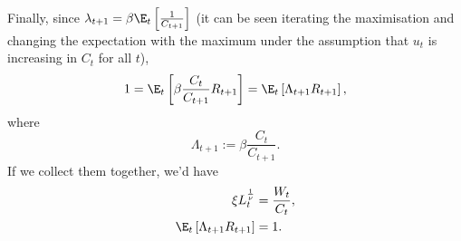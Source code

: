 \documentclass{article}
\begin{document}
	Finally, since $\lambda_{t+1} = \beta \E_t\left[\frac{1}{C_{t+1}}\right]$ (it can be seen iterating the maximisation and changing the expectation with the maximum under the assumption that $u_t$ is increasing in $C_{t}$ for all $t$),
		\begin{equation}
		1 = \E_t\left[\beta\frac{C_t}{C_{t+1}}R_{t+1}\right] = \E_t\left[\Lambda_{t+1} R_{t+1}\right],
	\end{equation}
	where
\begin{equation}\label{eq:RBC_GK_Lambda}
		\Lambda_{t+1}:= \beta \frac{C_t}{C_{t+1}}.
\end{equation}
	 If we collect them together, we'd have
	\begin{align}
			\xi L_t^{\frac{1}{\nu}} &= \frac{W_t}{C_t}, \label{FOC:RBC-GK_2_1} \\
	 \E_t\left[\Lambda_{t+1} R_{t+1}\right] &= 1.\label{FOC:RBC-GK_2_2}
	\end{align}
\end{document}
